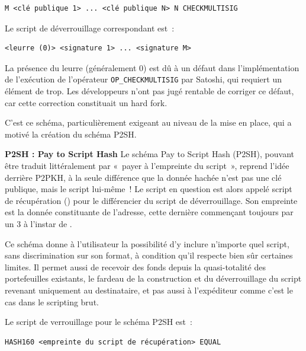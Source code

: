 \begin{Verbatim}[fontsize=\footnotesize]
M <clé publique 1> ... <clé publique N> N CHECKMULTISIG
\end{Verbatim}

Le script de déverrouillage correspondant est~:

\begin{Verbatim}[fontsize=\footnotesize]
<leurre (0)> <signature 1> ... <signature M>
\end{Verbatim}

La présence du leurre (généralement 0) est dû à un défaut dans l'implémentation de l'exécution de l'opérateur \texttt{OP\_CHECKMULTISIG} par Satoshi, qui requiert un élément de trop. Les développeurs n'ont pas jugé rentable de corriger ce défaut, car cette correction constituait un hard fork.

C'est ce schéma, particulièrement exigeant au niveau de la mise en place, qui a motivé la création du schéma P2SH.

\textbf{P2SH : Pay to Script Hash} Le schéma Pay to Script Hash (P2SH), pouvant être traduit littéralement par «~payer à l'empreinte du script~», reprend l'idée derrière P2PKH, à la seule différence que la donnée hachée n'est pas une clé publique, mais le script lui-même~! Le script en question est alors appelé script de récupération () pour le différencier du script de déverrouillage. Son empreinte est la donnée constituante de l'adresse, cette dernière commençant toujours par un 3 à l'instar de .


Ce schéma donne à l'utilisateur la possibilité d'y inclure n'importe quel script, sans discrimination sur son format, à condition qu'il respecte bien sûr certaines limites. Il permet aussi de recevoir des fonds depuis la quasi-totalité des portefeuilles existants, le fardeau de la construction et du déverrouillage du script revenant uniquement au destinataire, et pas aussi à l'expéditeur comme c'est le cas dans le scripting brut.

Le script de verrouillage pour le schéma P2SH est~:

\begin{Verbatim}[fontsize=\footnotesize]
HASH160 <empreinte du script de récupération> EQUAL
\end{Verbatim}

